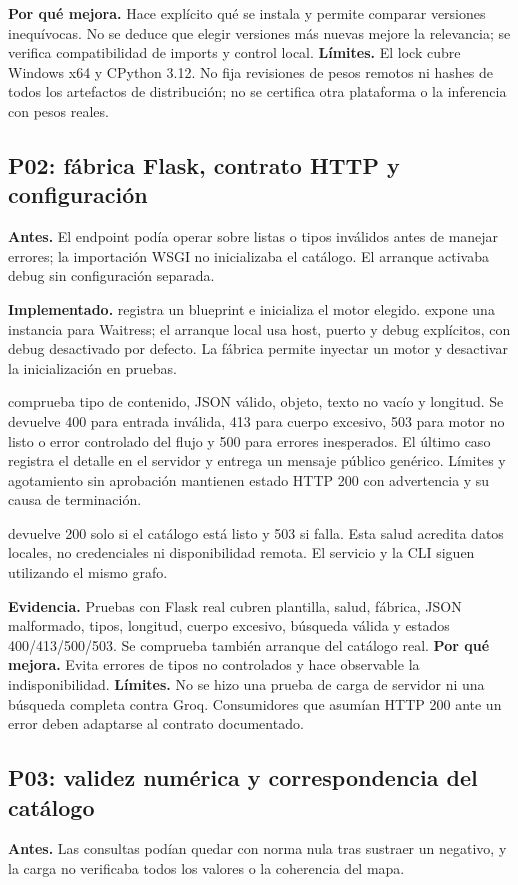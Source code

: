 \textbf{Por qué mejora.} Hace explícito qué se instala y permite comparar
versiones inequívocas. No se deduce que elegir versiones más nuevas mejore
la relevancia; se verifica compatibilidad de imports y control local.
\textbf{Límites.} El lock cubre Windows x64 y CPython 3.12. No fija revisiones
de pesos remotos ni hashes de todos los artefactos de distribución; no se
certifica otra plataforma o la inferencia con pesos reales.

\subsection{P02: fábrica Flask, contrato HTTP y configuración}
\textbf{Antes.} El endpoint podía operar sobre listas o tipos inválidos antes
de manejar errores; la importación WSGI no inicializaba el catálogo. El arranque
activaba debug sin configuración separada.

\textbf{Implementado.}  registra un blueprint e inicializa el
motor elegido.  expone una instancia para Waitress; el arranque
local usa host, puerto y debug explícitos, con debug desactivado por defecto.
La fábrica permite inyectar un motor y desactivar la inicialización en pruebas.

 comprueba tipo de contenido, JSON válido, objeto, texto no vacío
y longitud. Se devuelve 400 para entrada inválida, 413 para cuerpo excesivo,
503 para motor no listo o error controlado del flujo y 500 para errores
inesperados. El último caso registra el detalle en el servidor y entrega un
mensaje público genérico. Límites y agotamiento sin aprobación mantienen estado
HTTP 200 con advertencia y su causa de terminación.

 devuelve 200 solo si el catálogo está listo y 503 si falla.
Esta salud acredita datos locales, no credenciales ni disponibilidad remota.
El servicio y la CLI siguen utilizando el mismo grafo.

\textbf{Evidencia.} Pruebas con Flask real cubren plantilla, salud, fábrica,
JSON malformado, tipos, longitud, cuerpo excesivo, búsqueda válida y estados
400/413/500/503. Se comprueba también arranque del catálogo real.
\textbf{Por qué mejora.} Evita errores de tipos no controlados y hace observable
la indisponibilidad. \textbf{Límites.} No se hizo una prueba de carga de servidor
ni una búsqueda completa contra Groq. Consumidores que asumían HTTP 200 ante
un error deben adaptarse al contrato documentado.

\subsection{P03: validez numérica y correspondencia del catálogo}
\textbf{Antes.} Las consultas podían quedar con norma nula tras sustraer un
negativo, y la carga no verificaba todos los valores o la coherencia del mapa.

